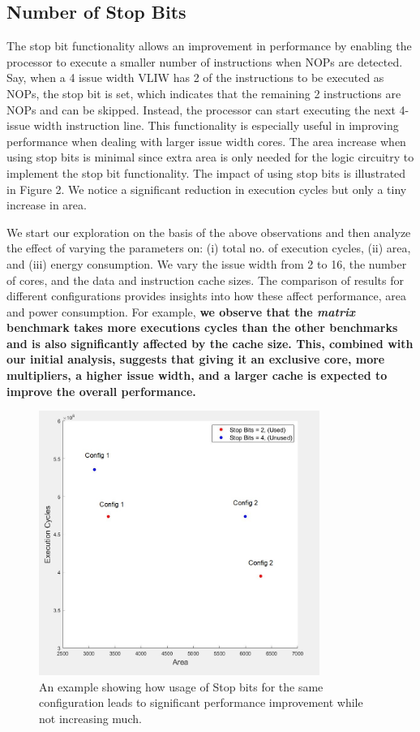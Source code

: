 \documentclass[conference]{IEEEtran}
\begin{document}
\subsection{Number of Stop Bits}
The stop bit functionality allows an improvement in performance by enabling the processor to execute a smaller number of instructions when NOPs are detected. Say, when a 4 issue width VLIW has 2 of the instructions to be executed as NOPs, the stop bit is set, which indicates that the remaining 2 instructions are NOPs and can be skipped. Instead, the processor can start executing the next 4-issue width instruction line. This functionality is especially useful in improving performance when dealing with larger issue width cores. The area increase when using stop bits is minimal since extra area is only needed for the logic circuitry to implement the stop bit functionality. The impact of using stop bits is illustrated in Figure 2. We notice a significant reduction in execution cycles but only a tiny increase in area.

We start our exploration on the basis of the above observations and then analyze the effect of varying the parameters on: (i) total no. of execution cycles, (ii) area, and (iii) energy consumption. We vary the issue width from 2 to 16, the number of cores, and the data and instruction cache sizes. The comparison of results for different configurations provides insights into how these affect performance, area and power consumption. For example, \textbf{we observe that the \textit{matrix} benchmark takes more executions cycles than the other benchmarks and is also significantly affected by the cache size. This, combined with our initial analysis, suggests that giving it an exclusive core, more multipliers, a higher issue width, and a larger cache is expected to improve the overall performance.}

\begin{figure}[h!]
\centering
\includegraphics[width=3.6in]{StopBitPlot.JPG}
\caption{\label{fig:data} An example showing how usage of Stop bits for the same configuration leads to significant performance improvement while not increasing much.}
\end{figure}
\end{document}

